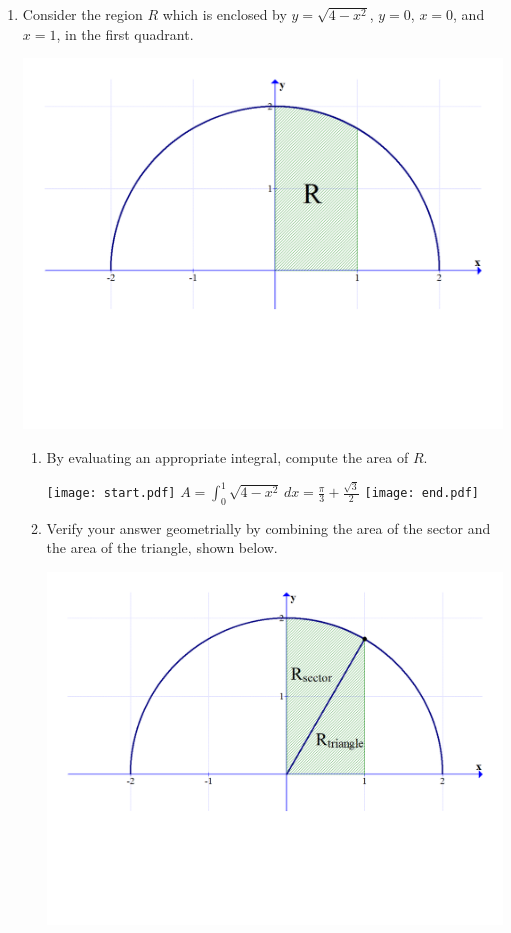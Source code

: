 \documentclass[12pt]{article}
\begin{document}
\begin{enumerate}
\begin{enumerate}
\end{enumerate}

\item Consider the region $R$ which is enclosed by $y=\sqrt{4-x^2}$, $y=0$, $x=0$, and $x=1$, in the first quadrant.

\begin{center}
\includegraphics[scale=0.5]{area.pdf}
\end{center}

\begin{enumerate}

\item By evaluating an appropriate integral, compute the area of $R$.

\texttt{[image: start.pdf]}
{{$A=\int_0^1 \sqrt{4-x^2} \,dx=\frac{\pi}{3}+\frac{\sqrt{3}}{2}$}}
\texttt{[image: end.pdf]}


\item Verify your answer geometrially by combining the area of the sector and the area of the triangle, shown below.

\begin{center}
\includegraphics[scale=0.5]{area2.pdf}
\end{center}


\end{enumerate}
\end{enumerate}
\end{document}
